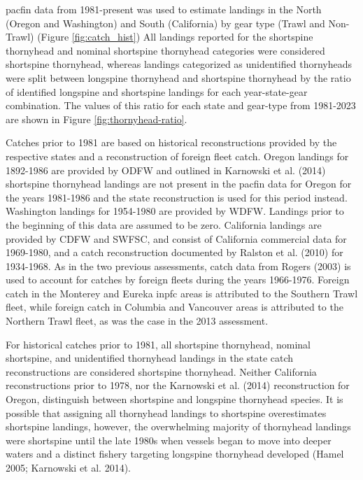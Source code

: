 \documentclass[11pt,
  english,
  letterpaper,
]{article}
\begin{document}
\Gls{pacfin} data from 1981-present was used to estimate landings in the North (Oregon and Washington) and South (California) by gear type (Trawl and Non-Trawl) (Figure \ref{fig:catch_hist}) All landings reported for the shortspine thornyhead and nominal shortspine thornyhead categories were considered shortspine thornyhead, whereas landings categorized as unidentified thornyheads were split between longspine thornyhead and shortspine thornyhead by the ratio of identified longspine and shortspine landings for each year-state-gear combination. The values of this ratio for each state and gear-type from 1981-2023 are shown in Figure \ref{fig:thornyhead-ratio}.

Catches prior to 1981 are based on historical reconstructions provided by the respective states and a reconstruction of foreign fleet catch. Oregon landings for 1892-1986 are provided by ODFW and outlined in Karnowski et al. (2014) shortspine thornyhead landings are not present in the \gls{pacfin} data for Oregon for the years 1981-1986 and the state reconstruction is used for this period instead. Washington landings for 1954-1980 are provided by WDFW. Landings prior to the beginning of this data are assumed to be zero. California landings are provided by CDFW and SWFSC, and consist of California commercial data for 1969-1980, and a catch reconstruction documented by Ralston et al. (2010) for 1934-1968. As in the two previous assessments, catch data from Rogers (2003) is used to account for catches by foreign fleets during the years 1966-1976. Foreign catch in the Monterey and Eureka \gls{inpfc} areas is attributed to the Southern Trawl fleet, while foreign catch in Columbia and Vancouver areas is attributed to the Northern Trawl fleet, as was the case in the 2013 assessment.

For historical catches prior to 1981, all shortspine thornyhead, nominal shortspine, and unidentified thornyhead landings in the state catch reconstructions are considered shortspine thornyhead. Neither California reconstructions prior to 1978, nor the Karnowski et al. (2014) reconstruction for Oregon, distinguish between shortspine and longspine thornyhead species. It is possible that assigning all thornyhead landings to shortspine overestimates shortspine landings, however, the overwhelming majority of thornyhead landings were shortspine until the late 1980s when vessels began to move into deeper waters and a distinct fishery targeting longspine thornyhead developed (Hamel 2005; Karnowski et al. 2014).
\end{document}
